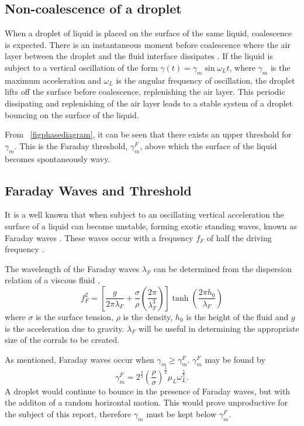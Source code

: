 \documentclass[11pt]{article}
\newcommand{\figref}[2][\figurename~]{#1\ref{#2}}
\begin{document}
\subsection{Non-coalescence of a droplet}
\label{secnoncoalescenceofadroplet}

When a droplet of liquid is placed on the surface of the same liquid, coalescence is expected.  There is an instantaneous moment before coalescence where the air layer between the droplet and the fluid interface dissipates \cite{2}.  If the liquid is subject to a vertical oscillation of the form $\gamma(t)=\gamma_m\sin\omega_L t$, where $\gamma_m$ is the maximum acceleration and $\omega_L$ is the angular frequency of oscillation, the droplet lifts off the surface before coalescence, replenishing the air layer.  This periodic dissipating and replenishing of the air layer leads to a stable system of a droplet bouncing on the surface of the liquid.

From \figref{figphasediagram}, it can be seen that there exists an upper threshold for $\gamma_m$.  This is the Faraday threshold, $\gamma_m^F$, above which the surface of the liquid becomes spontaneously wavy.

\subsection{Faraday Waves and Threshold}
\label{secfaradaywavesandthreshold}

It is a well known that when subject to an oscillating vertical acceleration the surface of a liquid can become unstable, forming exotic standing waves, known as Faraday waves \cite{20}.  These waves occur with a frequency $f_F$ of half the driving frequency \cite{15}.

The wavelength of the Faraday waves $\lambda_F$ can be determined from the dispersion relation of a viscous fluid \cite{8},
\begin{equation}
    \label{disp_rel}
    f_F^2=\left[\frac{g}{2\pi\lambda_F}+\frac{\sigma}{\rho}\left(\frac{2\pi}{\lambda_F^3}\right)\right]\tanh\left(\frac{2\pi h_0}{\lambda_F}\right)
\end{equation}
where $\sigma$ is the surface tension, $\rho$ is the density, $h_0$ is the height of the fluid and $g$ is the acceleration due to gravity.  $\lambda_F$ will be useful in determining the appropriate size of the corrals to be created.

As mentioned, Faraday waves occur when $\gamma_m\geq\gamma_m^F$.  $\gamma_m^F$ may be found by \cite{9}
\begin{equation}
    \label{faradaythreshold}
    \gamma_m^F=2^\frac{4}{3}\left(\frac{\rho}{\sigma}\right)^\frac{1}{3}\mu_L\omega_L^\frac{5}{3}.
\end{equation}
A droplet would continue to bounce in the presence of Faraday waves, but with the additon of a random horizontal motion.  This would prove unproductive for the subject of this report, therefore $\gamma_m$ must be kept below $\gamma_m^F$.
\end{document}
